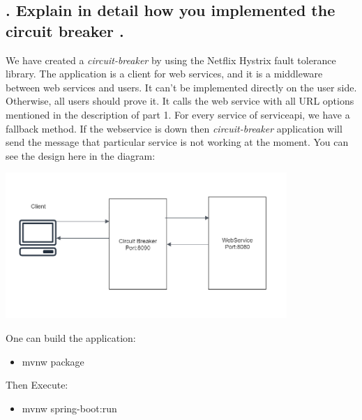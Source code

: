 
\subsection{. Explain in detail how you implemented the circuit
breaker
.}

We have created a \textit{circuit-breaker} by using the Netflix Hystrix fault tolerance library. The application is a client for web services, and it is a middleware between web services and users. It can't be implemented directly on the user side. Otherwise, all users should prove it. It calls the web service with all URL options mentioned in the description of part 1. For every service of serviceapi, we have a fallback method. If the webservice is down then \textit{circuit-breaker} application will send the message that particular service is not working at the moment. You can see the design here in the diagram:

\includegraphics[keepaspectratio,width=0.8\textwidth,angle=0]{images/Circuit.PNG}

One can build the application:

\begin{itemize}
\item mvnw package
\end{itemize}

Then Execute:

\begin{itemize}

\item mvnw spring-boot:run

\end{itemize}
